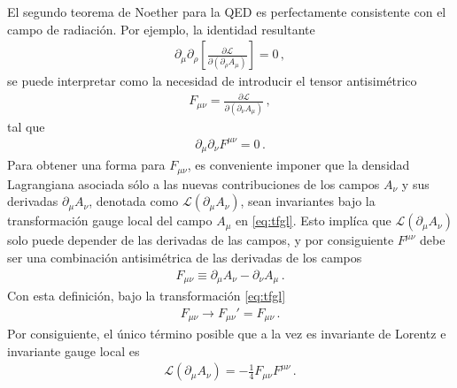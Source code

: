 \begin{frame}
El segundo teorema de Noether para la QED es perfectamente consistente con el campo de radiación. Por ejemplo,
la identidad resultante
\begin{align}
   \partial_{\mu} \partial_{\rho}\left[ \frac{\partial \mathcal{L}}{\partial \left(  \partial_{\rho} A_{\mu}\right)}  \right]=0\,,
\end{align}
se puede interpretar como la necesidad de introducir el tensor antisimétrico
\begin{align}
  F_{\mu\nu}=\frac{\partial \mathcal{L}}{\partial \left( \partial_{\nu} A_{\mu}\right)}\,,
\end{align}
tal que
\begin{align}
  \partial_{\mu}\partial_{\nu}F^{\mu\nu}=0\,.
\end{align}
Para obtener una forma para $F_{\mu\nu}$, es conveniente imponer que la densidad Lagrangiana asociada sólo a las nuevas contribuciones de los campos $A_{\nu}$ y sus derivadas $\partial_{\mu}A_{\nu}$, denotada como $\mathcal{L}\left( \partial_{\mu}A_{\nu}\right)$,
sean invariantes  bajo la transformación gauge local  del campo $A_{\mu}$ en \eqref{eq:tfgl}. Esto implíca que $\mathcal{L}\left( \partial_{\mu}A_{\nu}\right)$  solo puede depender de las derivadas de las campos, y por consiguiente $F^{\mu\nu}$ debe ser una combinación antisimétrica de las derivadas de los campos
\begin{align}
  F_{\mu\nu}\equiv\partial_{\mu}A_{\nu}-\partial_{\nu}A_{\mu}\,.
\end{align}
Con esta definición, bajo la transformación  \eqref{eq:tfgl}
\begin{align}
  F_{\mu\nu}\to F_{\mu\nu}'=F_{\mu\nu}\,.
\end{align}
Por consiguiente, el único término posible que a la vez es invariante de Lorentz e invariante gauge local es
\begin{align}
 \mathcal{L}\left( \partial_{\mu}A_{\nu}\right)=-\frac{1}{4}F_{\mu\nu}F^{\mu\nu}\,.
\end{align}
\end{frame} 

